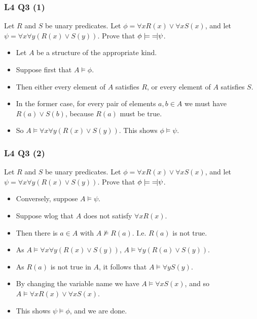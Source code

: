 \documentclass[handout]{beamer}
\newcommand{\lequiv}{\models\text{\reflectbox{$\models$}}}
\begin{document}
\begin{frame}
\frametitle{L4 Q3 (1)}
Let $R$ and $S$ be unary predicates. Let $\phi=\forall x R(x) \vee \forall x S(x)$, and let $\psi=\forall x \forall y (R(x)\vee S(y))$. Prove that $\phi\lequiv \psi$.
\vspace{0.5cm}
\begin{itemize}
\item Let $A$ be a structure of the appropriate kind. \vspace{0.2cm}
\item Suppose first that $A\models \phi$. \vspace{0.2cm}
\item Then either every element of $A$ satisfies $R$, or every element of $A$ satisfies $S$. \vspace{0.2cm}
\item In the former case, for every pair of elements $a,b\in A$ we must have $R(a)\vee S(b)$, because $R(a)$ must be true. \vspace{0.2cm}
\item So $A\models \forall x\forall y(R(x)\vee S(y))$. This shows $\phi\models \psi$.
\end{itemize}
\end{frame}

\begin{frame}
\frametitle{L4 Q3 (2)}
Let $R$ and $S$ be unary predicates. Let $\phi=\forall x R(x) \vee \forall x S(x)$, and let $\psi=\forall x \forall y (R(x)\vee S(y))$. Prove that $\phi\lequiv \psi$.
\vspace{0.5cm}
\begin{itemize}
\item Conversely, suppose $A\models \psi$. \vspace{0.2cm}
\item Suppose wlog that $A$ does not satisfy $\forall x R(x)$. \vspace{0.2cm}
\item Then there is $a\in A$ with $A\not\models R(a)$. I.e. $R(a)$ is not true. \vspace{0.2cm}
\item As $A\models \forall x\forall y(R(x)\vee S(y))$, \/$A\models \forall y(R(a)\vee S(y))$. \vspace{0.2cm}
\item As $R(a)$ is not true in $A$, it follows that $A\models \forall y S(y)$. \vspace{0.2cm}
\item By changing the variable name we have $A\models \forall x S(x)$, and so $A\models \forall x R(x) \vee \forall x S(x)$. \vspace{0.2cm}
\item This shows $\psi\models \phi$, and we are done.
\end{itemize}
\end{frame}
\end{document}
